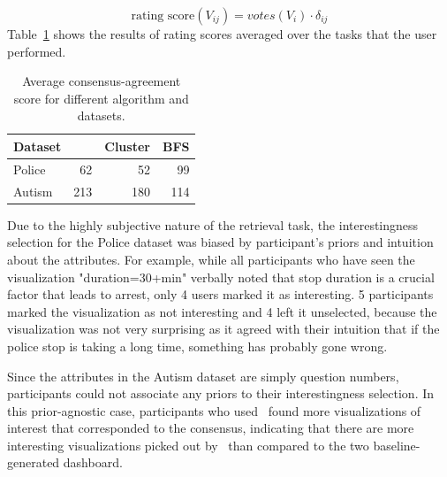 \begin{equation}\label{rank}
\textrm{rating score}(V_{ij}) =votes(V_i) \cdot \delta_{ij}
\end{equation}
Table~\ref{table:interesting_score} shows the results of rating scores averaged over the tasks that the user performed.
\begin{table}[ht!]
	\centering
	\begin{tabular}{lrrr}
		\hline
		 Dataset   &   \system &   Cluster &   BFS \\
		\hline
		 Police    &        62 &        52 &    99 \\
		 Autism    &       213 &       180 &   114 \\
		\hline
	\end{tabular}
	\caption{Average consensus-agreement score for different algorithm and datasets.}
	\label{table:interesting_score}
\end{table}
\par Due to the highly subjective nature of the retrieval task, the interestingness selection for the Police dataset was biased by participant's priors and intuition about the attributes. For example, while all participants who have seen the visualization "duration=30+min" verbally noted that stop duration is a crucial factor that leads to arrest, only 4 users marked it as interesting. 5 participants marked the visualization as not interesting and 4 left it unselected, because the visualization was not very surprising as it agreed with their intuition that if the police stop is taking a long time, something has probably gone wrong.
\par Since the attributes in the Autism dataset are simply question numbers, participants could not associate any priors to their interestingness selection. In this prior-agnostic case, participants who used \system\ found more visualizations of interest that corresponded to the consensus, indicating that there are more interesting visualizations picked out by \system\ than compared to the two baseline-generated dashboard.  

